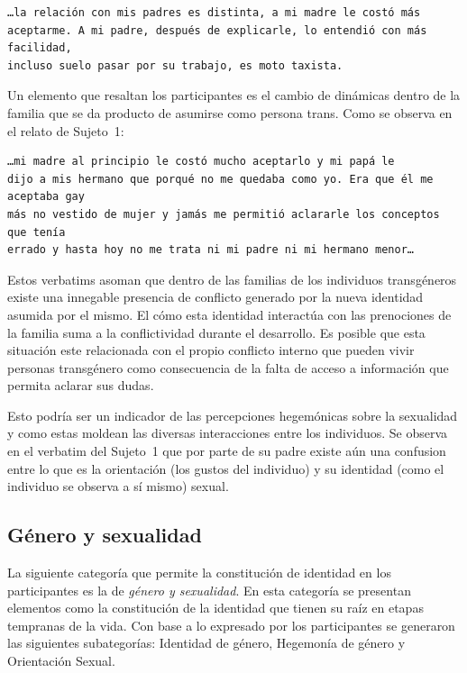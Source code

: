 \begin{verbatim}
…la relación con mis padres es distinta, a mi madre le costó más
aceptarme. A mi padre, después de explicarle, lo entendió con más facilidad,
incluso suelo pasar por su trabajo, es moto taxista.
\end{verbatim}

Un elemento que resaltan los participantes es el cambio de dinámicas dentro de
la familia que se da producto de asumirse como persona trans. Como se observa en
el relato de Sujeto~1:

\begin{verbatim}
…mi madre al principio le costó mucho aceptarlo y mi papá le
dijo a mis hermano que porqué no me quedaba como yo. Era que él me aceptaba gay
más no vestido de mujer y jamás me permitió aclararle los conceptos que tenía
errado y hasta hoy no me trata ni mi padre ni mi hermano menor…
\end{verbatim}

Estos verbatims asoman que dentro de las familias de los individuos transgéneros
existe una innegable presencia de conflicto generado por la nueva identidad
asumida por el mismo. El cómo esta identidad interactúa con las prenociones de
la familia suma a la conflictividad durante el desarrollo. Es posible que esta
situación este relacionada con el propio conflicto interno que pueden vivir
personas transgénero como consecuencia de la falta de acceso a información que
permita aclarar sus dudas.

Esto podría ser un indicador de las percepciones hegemónicas sobre la sexualidad
y como estas moldean las diversas interacciones entre los individuos. Se
observa en el verbatim del Sujeto~1 que por parte de su padre existe aún una
confusion entre lo que es la orientación (los gustos del individuo) y su
identidad (como el individuo se observa a sí mismo) sexual.

\subsection{Género y sexualidad}

La siguiente categoría que permite la constitución de identidad en los
participantes es la de \emph{género y sexualidad}. En esta categoría se
presentan elementos como la constitución de la identidad que tienen su raíz en
etapas tempranas de la vida. Con base a lo expresado por los participantes se
generaron las siguientes subategorías: Identidad de género, Hegemonía de género
y Orientación Sexual.

